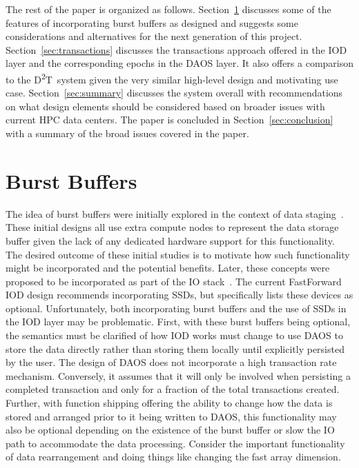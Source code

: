 \documentclass[conference]{sig-alt-gov2}
\newcommand{\DDT}{D\textsuperscript{2}T~}
\begin{document}
The rest of the paper is organized as follows. Section~\ref{sec:burst}
discusses some of the features of incorporating burst buffers as designed and
suggests some considerations and alternatives for the next generation of this
project. Section~\ref{sec:transactions} discusses the transactions approach
offered in the IOD layer and the corresponding epochs in the DAOS layer. It
also offers a comparison to the \DDT system given the very similar high-level
design and motivating use case.  Section~\ref{sec:summary} discusses the system
overall with recommendations on what design elements should be considered based
on broader issues with current HPC data centers. The paper is concluded in
Section~\ref{sec:conclusion} with a summary of the broad issues covered in the
paper.

\section{Burst Buffers}
\label{sec:burst}

The idea of burst buffers were initially explored in the context of data
staging~\cite{abbasi:2007:datatap,Abbasi:2009:datatap,nisar:2008:staging,zheng:2010:predata}.
These initial designs all use extra compute nodes to represent the data storage
buffer given the lack of any dedicated hardware support for this functionality.
The desired outcome of these initial studies is to motivate how such
functionality might be incorporated and the potential benefits.  Later, these
concepts were proposed to be incorporated as part of the IO
stack~\cite{bent:2012:challenges,bent:2012:burst-buffer}.  The current
FastForward IOD design recommends incorporating SSDs, but specifically lists
these devices as optional. Unfortunately, both incorporating burst buffers and
the use of SSDs in the IOD layer may be problematic.  First, with these burst
buffers being optional, the semantics must be clarified of how IOD works must
change to use DAOS to store the data directly rather than storing them locally
until explicitly persisted by the user. The design of DAOS does not incorporate
a high transaction rate mechanism. Conversely, it assumes that it will only be
involved when persisting a completed transaction and only for a fraction of the
total transactions created. Further, with function shipping offering the
ability to change how the data is stored and arranged prior to it being written
to DAOS, this functionality may also be optional depending on the existence of
the burst buffer or slow the IO path to accommodate the data processing.
Consider the important functionality of data rearrangement and doing things
like changing the fast array dimension.
\end{document}
